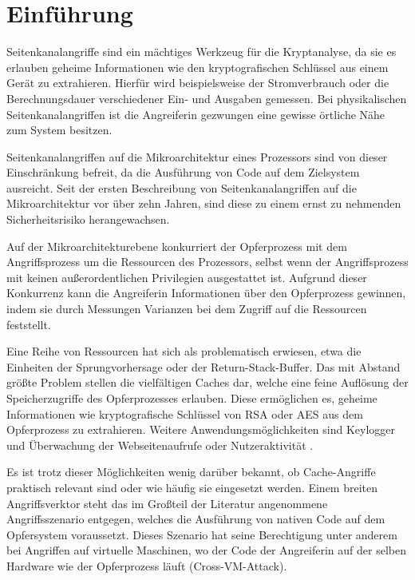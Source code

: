 \chapter{Einführung}
\label{chapter:introduction}


Seitenkanalangriffe sind ein mächtiges Werkzeug für die Kryptanalyse, da sie es erlauben geheime Informationen wie den kryptografischen Schlüssel aus einem Gerät zu extrahieren.
Hierfür wird beispielsweise der Stromverbrauch oder die Berechnungsdauer verschiedener Ein- und Ausgaben gemessen.
Bei physikalischen Seitenkanalangriffen ist die Angreiferin gezwungen eine gewisse örtliche Nähe zum System besitzen.

Seitenkanalangriffen auf die Mikroarchitektur eines Prozessors sind von dieser Einschränkung befreit, da die
Ausführung von Code auf dem Zielsystem ausreicht.
Seit der ersten Beschreibung von Seitenkanalangriffen auf die Mikroarchitektur vor über zehn Jahren, sind diese zu einem ernst zu nehmenden Sicherheitsrisiko herangewachsen.

Auf der Mikroarchitekturebene konkurriert der Opferprozess mit dem Angriffsprozess um die Ressourcen des Prozessors, selbst wenn der Angriffsprozess mit keinen außerordentlichen Privilegien ausgestattet ist.
Aufgrund dieser Konkurrenz kann die Angreiferin Informationen über den Opferprozess gewinnen, indem sie durch Messungen Varianzen bei dem Zugriff auf die Ressourcen feststellt.

Eine Reihe von Ressourcen hat sich als problematisch erwiesen, etwa die Einheiten der Sprungvorhersage oder der Return-Stack-Buffer.
Das mit Abstand größte Problem stellen die vielfältigen Caches dar, welche eine feine Auflösung der Speicherzugriffe des Opferprozesses erlauben.
Diese ermöglichen es, geheime Informationen wie kryptografische Schlüssel von RSA \cite{CacheBleedOpenSSLRSA} oder AES \cite{BernsteinAES} aus dem Opferprozess zu extrahieren.
Weitere Anwendungsmöglichkeiten sind Keylogger \cite{Keylogger} und Überwachung der Webseitenaufrufe oder Nutzeraktivität \cite{TheSpyInTheSandbox}.

Es ist trotz dieser Möglichkeiten wenig darüber bekannt, ob Cache-Angriffe praktisch relevant sind oder wie häufig sie eingesetzt werden.
Einem breiten Angriffsverktor steht das im Großteil der Literatur angenommene Angriffsszenario entgegen, welches die Ausführung von nativen Code auf dem Opfersystem voraussetzt.
Dieses Szenario hat seine Berechtigung unter anderem bei Angriffen auf virtuelle Maschinen, wo der Code der Angreiferin auf der selben Hardware wie der Opferprozess läuft (Cross-VM-Attack).

